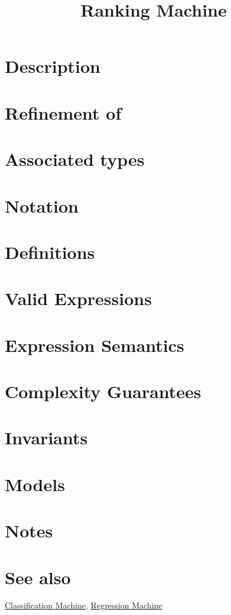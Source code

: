 \documentclass{article}
\begin{document}
\title{Ranking Machine}
\maketitle

\section*{Description}
\section*{Refinement of}
\section*{Associated types}
\section*{Notation}
\section*{Definitions}
\section*{Valid Expressions}
\section*{Expression Semantics}
\section*{Complexity Guarantees}
\section*{Invariants}
\section*{Models}
\section*{Notes}
\section*{See also}

\href{\kmlroot/classification.html}{Classification Machine},
\href{\kmlroot/regression.html}{Regression Machine}



\end{document}
